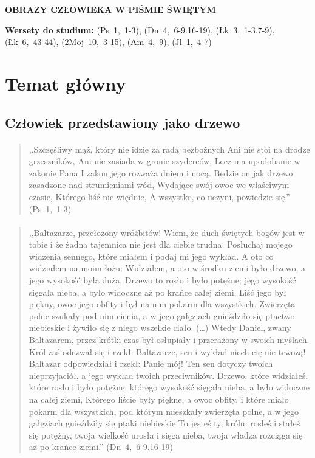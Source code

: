 \documentclass[10pt,a4paper,oneside]{article}
\begin{document}
\centerline{\textbf{\MakeUppercase{Obrazy człowieka w Piśmie Świętym}}}
\begin{center}
\textbf{Wersety do studium:} 
\mbox{(Ps 1, 1-3)}, \mbox{(Dn 4, 6-9.16-19)}, \mbox{(Łk 3, 1-3.7-9)}, \mbox{(Łk 6, 43-44)}, \mbox{(2Moj 10, 3-15)}, \mbox{(Am 4, 9)}, \mbox{(Jl 1, 4-7)}
\end{center}
\section{Temat główny}
\subsection{Człowiek przedstawiony jako drzewo}
\paragraph{}
\begin{quote}
,,Szczęśliwy mąż, który nie idzie za radą bezbożnych Ani nie stoi na drodze grzeszników, Ani nie zasiada w gronie szyderców, Lecz ma upodobanie w zakonie Pana I zakon jego rozważa dniem i nocą. Będzie on jak drzewo zasadzone nad strumieniami wód, Wydające swój owoc we właściwym czasie, Którego liść nie więdnie, A wszystko, co uczyni, powiedzie się.'' \mbox{(Ps 1, 1-3)}
\end{quote}
\paragraph{}
\begin{quote}
,,Baltazarze, przełożony wróżbitów! Wiem, że duch świętych bogów jest w tobie i że żadna tajemnica nie jest dla ciebie trudna. Posłuchaj mojego widzenia sennego, które miałem i podaj mi jego wykład. A oto co widziałem na moim łożu: Widziałem, a oto w środku ziemi było drzewo, a jego wysokość była duża. Drzewo to rosło i było potężne; jego wysokość sięgała nieba, a było widoczne aż po krańce całej ziemi. Liść jego był piękny, owoc jego obfity i był na nim pokarm dla wszystkich. Zwierzęta polne szukały pod nim cienia, a w jego gałęziach gnieździło się ptactwo niebieskie i żywiło się z niego wszelkie ciało. (\ldots) Wtedy Daniel, zwany Baltazarem, przez krótki czas był osłupiały i przerażony w swoich myślach. Król zaś odezwał się i rzekł: Baltazarze, sen i wykład niech cię nie trwożą! Baltazar odpowiedział i rzekł: Panie mój! Ten sen dotyczy twoich nieprzyjaciół, a jego wykład twoich przeciwników. Drzewo, które widziałeś, które rosło i było potężne, którego wysokość sięgała nieba, a było widoczne na całej ziemi, Którego liście były piękne, a owoc obfity, i które miało pokarm dla wszystkich, pod którym mieszkały zwierzęta polne, a w jego gałęziach gnieździły się ptaki niebieskie To jesteś ty, królu: rosłeś i stałeś się potężny, twoja wielkość urosła i sięga nieba, twoja władza rozciąga się aż po krańce ziemi.'' \mbox{(Dn 4, 6-9.16-19)}
\end{quote}
\end{document}
